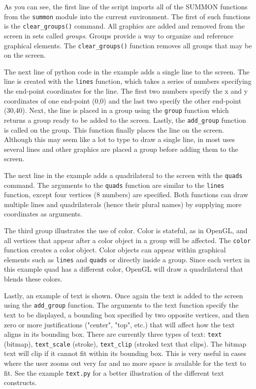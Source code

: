 \documentclass[12pt]{article}
\newcommand{\code}[1]{{\tt #1}}
\begin{document}
As you can see, the first line of the script imports all of the SUMMON functions
from the \code{summon} module into the current environment.  The first of such
functions is the \code{clear\_groups()} command.  All graphics are added and
removed from the screen in sets called {\em groups}.  Groups provide a way to
organize and reference graphical elements.  The \code{clear\_groups()} function
removes all groups that may be on the screen.

The next line of python code in the example adds a single line to the screen. 
The line is created with the \code{lines} function, which takes a series of
numbers specifying the end-point coordinates for the line.  The first
two numbers specify the x and y coordinates of one end-point (0,0) and the last
two specify the other end-point (30,40).  Next, the line is placed in a group
using the \code{group} function which returns a group ready to be added to the
screen.   Lastly, the \code{add\_group} function is called on the group.  This
function finally places the line on the screen.  Although this may seem like a
lot to type to draw a single line, in most uses several lines and other graphics 
are placed a group before adding them to the screen.

The next line in the example adds a quadrilateral to the screen with the
\code{quads} command.  The arguments to the \code{quads} function are similar to
the \code{lines} function, except four vertices (8 numbers) are specified.  Both
functions can draw multiple lines and quadrilaterals (hence their plural names)
by supplying more coordinates as arguments.

The third group illustrates the use of color.  Color is stateful, as in OpenGL,
and all vertices that appear after a color object in a group will be affected. 
The \code{color} function creates a color object.  Color objects can appear
within graphical elements such as \code{lines} and \code{quads} or directly
inside a group.  Since each vertex in this example quad has a different color,
OpenGL will draw a quadrilateral that blends these colors.

Lastly, an example of text is shown.  Once again the text is added to the screen
using the \code{add\_group} function.  The arguments to the text function
specify the text to be displayed, a bounding box specified by two
opposite  vertices, and then zero or more justifications ("center", "top",
etc.) that will affect how the text aligns in its bounding box.  There are
currently three types of text: \code{text} (bitmap), \code{text\_scale} (stroke),
\code{text\_clip} (stroked text that clips).  The bitmap text will clip if it
cannot fit within its bounding box.  This is very useful in cases where the user
zooms out very far and no more space is available for the text to fit.  See the
example \code{text.py} for a better illustration of the different text
constructs.
\end{document}

